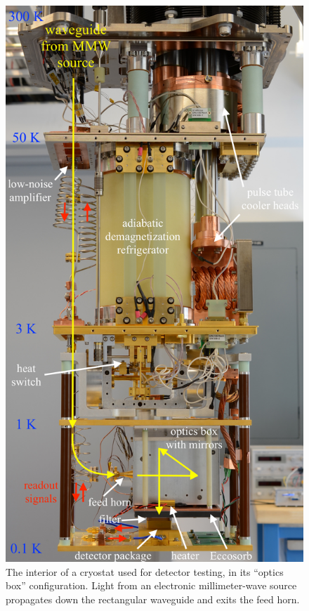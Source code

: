 \begin{figure}[ht]
\centering
\includegraphics[height=0.8\textheight]{hardware/starcryo_cryostat_with_optics_box.jpg}
\caption[The interior of a cryostat used for detector testing, in its ``optics box'' configuration.]
{
The interior of a cryostat used for detector testing, in its ``optics box'' configuration.
Light from an electronic millimeter-wave source propagates down the rectangular waveguide and exits the feed horn.
}
\end{figure}
